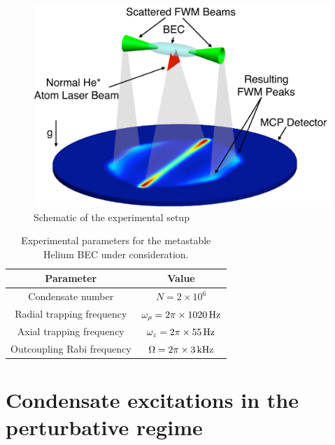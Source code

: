 \begin{figure}
    \centering
        \includegraphics[height=3in]{Schematic}
    \caption{Schematic of the experimental setup}
    \label{Peaks:Schematic}
\end{figure}


\begin{table}
    \centering
    \begin{tabular}{cc}
    \toprule
    Parameter & Value\\
    \midrule
    Condensate number & $N = 2\times 10^6$\\
    Radial trapping frequency & $\omega_\rho = 2 \pi \times \unit[1020]{Hz}$\\
    Axial trapping frequency & $\omega_z = 2\pi \times \unit[55]{Hz}$\\
    Outcoupling Rabi frequency & $\Omega = 2\pi \times \unit[3]{kHz}$\\
    \bottomrule
    \end{tabular}
    \caption{Experimental parameters for the metastable Helium BEC under consideration.}
    \label{Peaks:ExperimentalParameters}
\end{table}

\clearpage
\section{Condensate excitations in the perturbative regime}
\label{Peaks:PerturbativeApproach}

